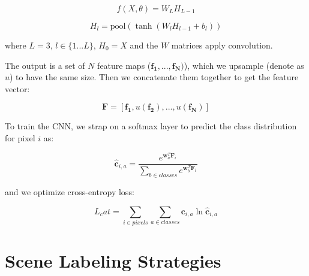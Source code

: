 \documentclass[a4paper]{article}
\begin{document}
$$
f(X, \theta) = W_L H_{L-1}
$$

$$
H_l = \textrm{pool}(\tanh(W_l H_{l-1} + b_l))
$$

where $L = 3$, $l \in \{1...L\}$, $H_0 = X$ and the $W$ matrices apply
convolution.

The output is a set of $N$ feature maps ($\mathbf{f_1}, ..., \mathbf{f_N})$),
which we upsample (denote as $u$) to have the same size. Then we concatenate
them together to get the feature vector:

$$
\mathbf{F} = [\mathbf{f_1}, u(\mathbf{f_2}), ..., u(\mathbf{f_N})]
$$

To train the CNN, we strap on a softmax layer to predict the class distribution
for pixel $i$ as:

$$
\hat{\mathbf{c}}_{i, a} = \frac{e^{\mathbf{w}_a^T \mathbf{F}_i}}{
\sum_{b \in classes}{e^{\mathbf{w}_b^T \mathbf{F}_i}}
}
$$

and we optimize cross-entropy loss:

$$
L_cat = \sum_{i \in pixels}{\sum_{a \in classes}{\mathbf{c}_{i, a} \ln{
\hat{\mathbf{c}}_{i, a}
}}}
$$

\section{Scene Labeling Strategies}
\end{document}
